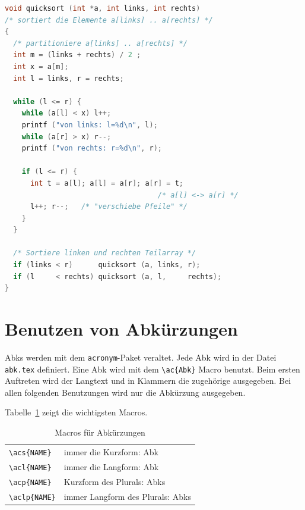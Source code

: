 \begin{lstlisting}[language=c,
                   frame=single,           % Ein Rahmen um den Code
                   framexleftmargin=15pt,  % Rahmen link von den Zahlen
                   style=algoBericht,
                   label={algo-quicksort},
                   captionpos=b,           % Caption unter den Code setzen
		   caption={quicksort in C}]
void quicksort (int *a, int links, int rechts)
/* sortiert die Elemente a[links] .. a[rechts] */
{
  /* partitioniere a[links] .. a[rechts] */
  int m = (links + rechts) / 2 ;
  int x = a[m];
  int l = links, r = rechts;

  while (l <= r) {
    while (a[l] < x) l++;
    printf ("von links: l=%d\n", l);
    while (a[r] > x) r--;
    printf ("von rechts: r=%d\n", r);

    if (l <= r) {
      int t = a[l]; a[l] = a[r]; a[r] = t;
                                    /* a[l] <-> a[r] */
      l++; r--;   /* "verschiebe Pfeile" */
    }
  }

  /* Sortiere linken und rechten Teilarray */
  if (links < r)      quicksort (a, links, r);
  if (l     < rechts) quicksort (a, l,     rechts);
}
\end{lstlisting}


\section{Benutzen von Abkürzungen}

\acp{Abk} %
werden mit dem \verb+acronym+-Paket veraltet.
Jede
\ac{Abk} %
wird in der Datei \texttt{abk.tex} definiert.
Eine \ac{Abk} wird mit dem \verb+\ac{Abk}+  Macro benutzt. Beim ersten Auftreten
wird der Langtext und in Klammern die zugehörige  ausgegeben. Bei allen
folgenden Benutzungen wird nur die Abkürzung ausgegeben.

Tabelle~\ref{acronym-macros} zeigt die wichtigsten Macros.
\begin{table}[ht]
\begin{center}
\begin{tabular}{|ll|}\hline
\verb+\acs{NAME}+  & immer die Kurzform: \acs{Abk}		\\
\verb+\acl{NAME}+  & immer die Langform: \acl{Abk}		\\
\verb+\acp{NAME}+  & Kurzform des Plurals: \acp{Abk}		\\
\verb+\aclp{NAME}+ & immer Langform des Plurals: \aclp{Abk}	\\\hline
\end{tabular}
\end{center}
\caption{\label{acronym-macros}Macros für Abkürzungen}
\end{table}


